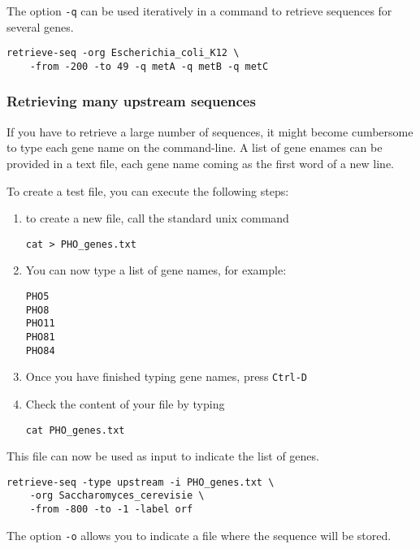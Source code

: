 The option \texttt{-q} can be used iteratively in a command to
retrieve sequences for several genes.

\begin{verbatim}
retrieve-seq -org Escherichia_coli_K12 \
    -from -200 -to 49 -q metA -q metB -q metC
\end{verbatim}

\subsubsection{Retrieving many upstream sequences}

If you have to retrieve a large number of sequences, it might become
cumbersome to type each gene name on the command-line. A list of gene
enames can be provided in a text file, each gene name coming as the
first word of a new line.

To create a test file, you can execute the following steps:
\begin{enumerate}
\item to create a new file, call the standard unix command 

\begin{verbatim}
cat > PHO_genes.txt
\end{verbatim} 

\item You can now type a list of gene names, for example:

\begin{verbatim}
PHO5
PHO8
PHO11
PHO81
PHO84
\end{verbatim} 

\item Once you have finished typing gene names, press \texttt{Ctrl-D}

\item Check the content of your file by typing 

\begin{verbatim}
cat PHO_genes.txt
\end{verbatim} 

\end{enumerate}


This file can now be used as input to indicate the list of genes.

\begin{verbatim}
retrieve-seq -type upstream -i PHO_genes.txt \
    -org Saccharomyces_cerevisie \
    -from -800 -to -1 -label orf
\end{verbatim} 

The option \texttt{-o} allows you to indicate a file where the
sequence will be stored.

